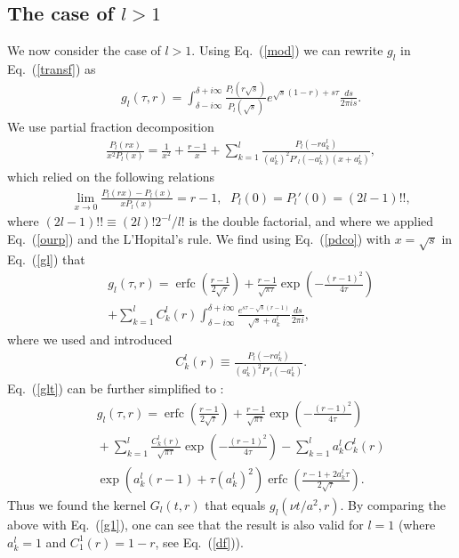 \documentclass[aps,prx,twocolumn,amsmath,amssymb,amsfonts]{revtex4-2}
\DeclareMathOperator\erfc{erfc}
\begin{document}
\subsection{The case of $l>1$}

We now consider the case of $l>1$. Using Eq.~(\ref{mod}) we can rewrite $g_l$ in Eq.~(\ref{transf}) as
\begin{eqnarray}&&
g_l(\tau, r)=\int_{\delta-i\infty}^{\delta+i\infty}\frac{P_l(r \sqrt{s})}{P_l(\sqrt{s})}e^{\sqrt{s}(1-r)+s\tau}\frac{ds}{2\pi i s}. \label{gl}
\end{eqnarray}
We use partial fraction decomposition
\begin{eqnarray}&&\!\!\!\!\!
\frac{P_l(r x)}{x^2P_l(x)}\!=\!\frac{1}{x^2}\!+\!\frac{r\!-\!1}{x}\!+\!\sum_{k=1}^{l} \! \frac{P_l(-r a_k^{l})}{(a_k^{l})^2P'_l(-a_k^{l}) (x\!+\!a_k^{l})}, \label{pdco}
\end{eqnarray}
which relied on the following relations
\begin{eqnarray}&&\!\!\!\!\!
\lim_{x\to 0}\frac{P_l(r x)\!-\!P_l(x)}{xP_l(x)}\!=\!r\!-\!1,\,\ \ P_l(0)\!=\!P_l'(0)\!=\!(2l-1)!!,\nonumber
\end{eqnarray}
where $(2l-1)!!\equiv (2l)!2^{-l}/l!$ is the double factorial, and where we applied Eq.~(\ref{ourp}) and the L'Hopital's rule. We find using Eq.~(\ref{pdco}) with $x=\sqrt{s}$ in Eq.~(\ref{gl}) that
\begin{eqnarray}&&
g_l(\tau, r)=\erfc\left(\frac{r-1}{2\sqrt{\tau}}\right)+\frac{r-1}{\sqrt{\pi \tau}} \exp{\left(-\frac{(r-1)^2}{4\tau}\right)}
\nonumber\\&&
+\sum_{k=1}^{l}\!C_k^{l}(r)\int_{\delta-i\infty}^{\delta+i\infty}\!\! \frac{e^{s\tau\!-\!\sqrt{s}(r-1)}}{\sqrt{s}\!+\!a_k^{l}}\frac{ds}{2\pi i},\label{glt}
\end{eqnarray}
where we used \cite{prud} and introduced
\begin{eqnarray}&&
C_k^{l}(r)\equiv \frac{P_l(-r a_k^{l})}{(a_k^{l})^2P'_l(-a_k^{l})}. \label{df}
\end{eqnarray}
Eq.~(\ref{glt}) can be further simplified to \cite{prud}:
\begin{eqnarray}&&\!\!
g_l(\tau, r)=\erfc\left(\frac{r-1}{2\sqrt{\tau}}\right)+\frac{r-1}{\sqrt{\pi \tau}}\exp\left(-\frac{(r-1)^2}{4\tau}\right)
\nonumber\\&&\!\!
+\sum_{k=1}^{l}\!\frac{C_k^{l}(r)}{\sqrt{\pi \tau}}\exp\left(-\frac{(r-1)^2}{4\tau}\right)-\sum_{k=1}^{l} a_k^{l} C_k^{l}(r)\nonumber
\\&&\!\!
\exp\left(a_k^{l}(r-1)+\tau (a_k^{l})^2\right)\erfc\left(\frac{r-1+2a_k^{l}\tau}{2\sqrt{\tau}}\right). \label{fid}
\end{eqnarray}
Thus we found the kernel $G_l(t, r)$ that equals $g_l(\nu t/a^2, r)$. By comparing the above with Eq.~(\ref{g1}), one can see that the result is also valid for $l=1$ (where $a_k^{l}=1$ and $C_1^{1}(r)=1-r$, see  Eq.~(\ref{df})).
\end{document}
